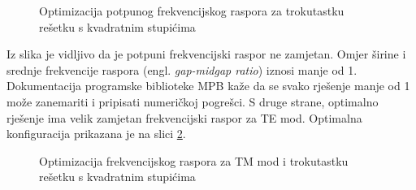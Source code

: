 \documentclass[utf8, seminar, numeric]{fer}
\begin{document}
\begin{figure}[ht]
	\caption{Optimizacija potpunog frekvencijskog raspora za trokutastku rešetku s
	kvadratnim stupićima}
	\label{fig:triangular_squares_optimization}
\end{figure}

Iz slika je vidljivo da je potpuni frekvencijski raspor ne zamjetan. Omjer širine i
srednje frekvencije raspora (engl. \textit{gap-midgap ratio}) iznosi manje od 1.
Dokumentacija programske biblioteke MPB kaže da se svako rješenje manje od 1 može
zanemariti i pripisati numeričkoj pogrešci. S druge strane, optimalno rješenje ima
velik zamjetan frekvencijski raspor za TE mod. Optimalna konfiguracija prikazana 
je na slici \ref{fig:triangular_squares_te_optimization}.

\begin{figure}[ht]
\centering
    \qquad
	\caption{Optimizacija frekvencijskog raspora za TM mod i trokutastku rešetku s
	kvadratnim stupićima}
	\label{fig:triangular_squares_te_optimization}
\end{figure}
\end{document}
